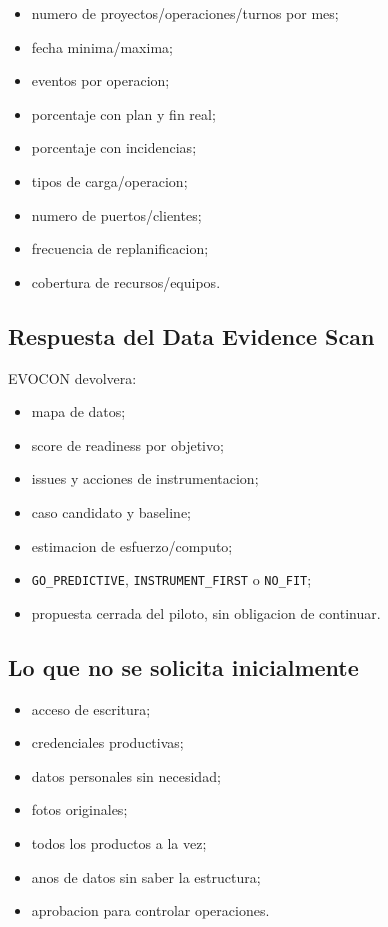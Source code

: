 \documentclass[
  spanish,
  10pt,
  a4paper,
]{article}
\providecommand{\tightlist}{%
  \setlength{\itemsep}{0pt}\setlength{\parskip}{0pt}}
\begin{document}
\begin{itemize}
\tightlist
\item
  numero de proyectos/operaciones/turnos por mes;
\item
  fecha minima/maxima;
\item
  eventos por operacion;
\item
  porcentaje con plan y fin real;
\item
  porcentaje con incidencias;
\item
  tipos de carga/operacion;
\item
  numero de puertos/clientes;
\item
  frecuencia de replanificacion;
\item
  cobertura de recursos/equipos.
\end{itemize}

\subsection{Respuesta del Data Evidence
Scan}\label{respuesta-del-data-evidence-scan}

EVOCON devolvera:

\begin{itemize}
\tightlist
\item
  mapa de datos;
\item
  score de readiness por objetivo;
\item
  issues y acciones de instrumentacion;
\item
  caso candidato y baseline;
\item
  estimacion de esfuerzo/computo;
\item
  \texttt{GO\_PREDICTIVE}, \texttt{INSTRUMENT\_FIRST} o
  \texttt{NO\_FIT};
\item
  propuesta cerrada del piloto, sin obligacion de continuar.
\end{itemize}

\subsection{Lo que no se solicita
inicialmente}\label{lo-que-no-se-solicita-inicialmente}

\begin{itemize}
\tightlist
\item
  acceso de escritura;
\item
  credenciales productivas;
\item
  datos personales sin necesidad;
\item
  fotos originales;
\item
  todos los productos a la vez;
\item
  anos de datos sin saber la estructura;
\item
  aprobacion para controlar operaciones.
\end{itemize}
\end{document}
